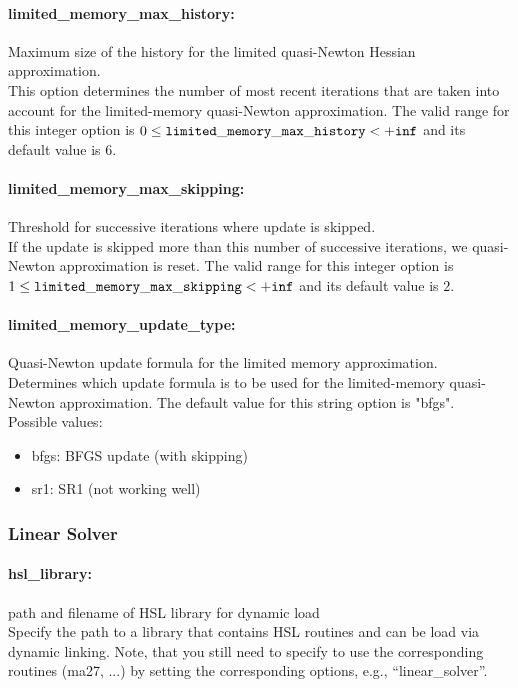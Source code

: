 \paragraph{limited\_memory\_max\_history:}\label{sec:limited_memory_max_history} Maximum size of the history for the limited quasi-Newton Hessian approximation. $\;$ \\
 This option determines the number of most recent
iterations that are taken into account for the
limited-memory quasi-Newton approximation. The valid range for this integer option is
$0 \le {\tt limited\_memory\_max\_history } <  {\tt +inf}$
and its default value is $6$.


\paragraph{limited\_memory\_max\_skipping:}\label{sec:limited_memory_max_skipping} Threshold for successive iterations where update is skipped. $\;$ \\
 If the update is skipped more than this number of
successive iterations, we quasi-Newton
approximation is reset. The valid range for this integer option is
$1 \le {\tt limited\_memory\_max\_skipping } <  {\tt +inf}$
and its default value is $2$.


\paragraph{limited\_memory\_update\_type:}\label{sec:limited_memory_update_type} Quasi-Newton update formula for the limited memory approximation. $\;$ \\
 Determines which update formula is to be used for
the limited-memory quasi-Newton approximation.
The default value for this string option is "bfgs".
\\ 
Possible values:
\begin{itemize}
   \item bfgs: BFGS update (with skipping)
   \item sr1: SR1 (not working well)
\end{itemize}



\subsubsection{Linear Solver}
\label{sec:Linear_Solver}

\paragraph{hsl\_library:}\label{sec:hsl_library} path and filename of HSL library for dynamic load $\;$ \\
 Specify the path to a library that contains HSL
routines and can be load via dynamic
linking. Note, that you still need to specify to
use the corresponding routines (ma27, ...) by
setting the corresponding options, e.g., ``linear\_solver''.


